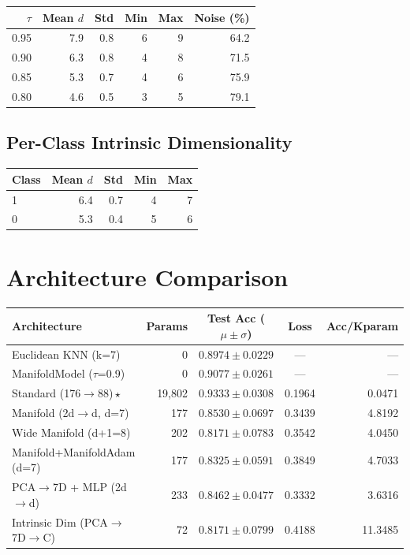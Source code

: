 \documentclass[11pt,letterpaper]{article}
\begin{document}
\begin{tabular}{@{}rrrrrr@{}}
\toprule
$\tau$ & Mean $d$ & Std & Min & Max & Noise (\%) \\
\midrule
  0.95 & 7.9 & 0.8 & 6 & 9 & 64.2 \\
  0.90 & 6.3 & 0.8 & 4 & 8 & 71.5 \\
  0.85 & 5.3 & 0.7 & 4 & 6 & 75.9 \\
  0.80 & 4.6 & 0.5 & 3 & 5 & 79.1 \\
\bottomrule
\end{tabular}

\subsection{Per-Class Intrinsic Dimensionality}

\begin{tabular}{@{}lrrrr@{}}
\toprule
Class & Mean $d$ & Std & Min & Max \\
\midrule
  1 & 6.4 & 0.7 & 4 & 7 \\
  0 & 5.3 & 0.4 & 5 & 6 \\
\bottomrule
\end{tabular}

\section{Architecture Comparison}

{\small
\begin{tabular}{@{}p{7cm}rccr@{}}
\toprule
\textbf{Architecture} & \textbf{Params} & \textbf{Test Acc ($\mu \pm \sigma$)} & \textbf{Loss} & \textbf{Acc/Kparam} \\
\midrule
  {Euclidean KNN (k=7)} & 0 & $0.8974 \pm 0.0229$ & --- & --- \\
  {ManifoldModel ($\tau$=0.9)} & 0 & $0.9077 \pm 0.0261$ & --- & --- \\
  {\color{wincolor}Standard (176$\rightarrow$88)\,$\star$} & 19,802 & $0.9333 \pm 0.0308$ & 0.1964 & 0.0471 \\
  {Manifold (2d$\rightarrow$d, d=7)} & 177 & $0.8530 \pm 0.0697$ & 0.3439 & 4.8192 \\
  {Wide Manifold (d+1=8)} & 202 & $0.8171 \pm 0.0783$ & 0.3542 & 4.0450 \\
  {Manifold+ManifoldAdam (d=7)} & 177 & $0.8325 \pm 0.0591$ & 0.3849 & 4.7033 \\
  {PCA$\rightarrow$7D + MLP (2d$\rightarrow$d)} & 233 & $0.8462 \pm 0.0477$ & 0.3332 & 3.6316 \\
  {Intrinsic Dim (PCA$\rightarrow$7D$\rightarrow$C)} & 72 & $0.8171 \pm 0.0799$ & 0.4188 & 11.3485 \\
\bottomrule
\end{tabular}
}
\end{document}

